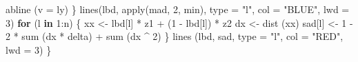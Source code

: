 \documentclass[
  12pt,
  letterpaper,
  DIV=11,
  numbers=noendperiod]{scrreprt}
\newenvironment{Shaded}{\begin{snugshade}}{\end{snugshade}}
\newcommand{\AttributeTok}[1]{\textcolor[rgb]{0.40,0.45,0.13}{#1}}
\newcommand{\ControlFlowTok}[1]{\textcolor[rgb]{0.00,0.23,0.31}{\textbf{#1}}}
\newcommand{\DecValTok}[1]{\textcolor[rgb]{0.68,0.00,0.00}{#1}}
\newcommand{\FunctionTok}[1]{\textcolor[rgb]{0.28,0.35,0.67}{#1}}
\newcommand{\NormalTok}[1]{\textcolor[rgb]{0.00,0.23,0.31}{#1}}
\newcommand{\OtherTok}[1]{\textcolor[rgb]{0.00,0.23,0.31}{#1}}
\newcommand{\SpecialCharTok}[1]{\textcolor[rgb]{0.37,0.37,0.37}{#1}}
\newcommand{\StringTok}[1]{\textcolor[rgb]{0.13,0.47,0.30}{#1}}
\theoremstyle{remark}
\begin{document}
\begin{Shaded}
\begin{Highlighting}[]
    \FunctionTok{abline}\NormalTok{ (}\AttributeTok{v =}\NormalTok{ ly)}
\NormalTok{  \}}
  \FunctionTok{lines}\NormalTok{(lbd,}
        \FunctionTok{apply}\NormalTok{(mad, }\DecValTok{2}\NormalTok{, min),}
        \AttributeTok{type =} \StringTok{"l"}\NormalTok{,}
        \AttributeTok{col =} \StringTok{"BLUE"}\NormalTok{,}
        \AttributeTok{lwd =} \DecValTok{3}\NormalTok{)}
  \ControlFlowTok{for}\NormalTok{ (l }\ControlFlowTok{in} \DecValTok{1}\SpecialCharTok{:}\NormalTok{n) \{}
\NormalTok{    xx }\OtherTok{\textless{}{-}}\NormalTok{ lbd[l] }\SpecialCharTok{*}\NormalTok{ z1 }\SpecialCharTok{+}\NormalTok{ (}\DecValTok{1} \SpecialCharTok{{-}}\NormalTok{ lbd[l]) }\SpecialCharTok{*}\NormalTok{ z2}
\NormalTok{    dx }\OtherTok{\textless{}{-}} \FunctionTok{dist}\NormalTok{ (xx)}
\NormalTok{    sad[l] }\OtherTok{\textless{}{-}} \DecValTok{1} \SpecialCharTok{{-}} \DecValTok{2} \SpecialCharTok{*} \FunctionTok{sum}\NormalTok{ (dx }\SpecialCharTok{*}\NormalTok{ delta) }\SpecialCharTok{+} \FunctionTok{sum}\NormalTok{ (dx }\SpecialCharTok{\^{}} \DecValTok{2}\NormalTok{)}
\NormalTok{  \}}
  \FunctionTok{lines}\NormalTok{ (lbd,}
\NormalTok{         sad,}
         \AttributeTok{type =} \StringTok{"l"}\NormalTok{,}
         \AttributeTok{col =} \StringTok{"RED"}\NormalTok{,}
         \AttributeTok{lwd =} \DecValTok{3}\NormalTok{)}
\NormalTok{\}}


\end{Highlighting}
\end{Shaded}
\end{document}

